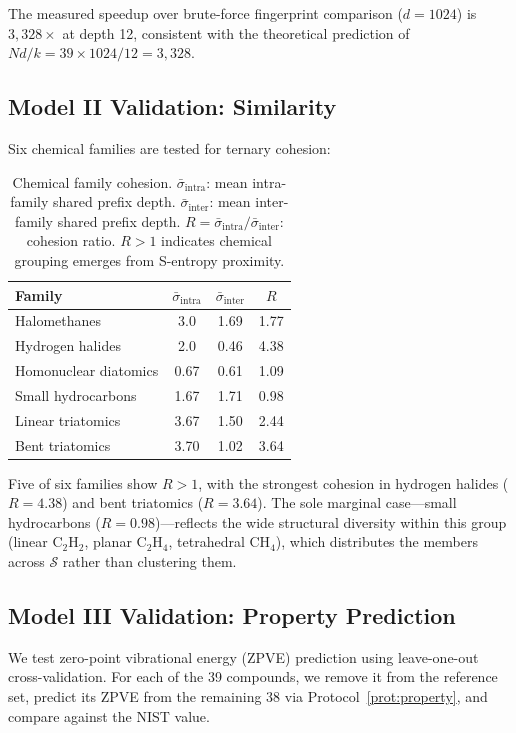 \documentclass[11pt,twocolumn,a4paper]{article}
\theoremstyle{definition}
\theoremstyle{remark}
\newcommand{\Sspace}{\mathcal{S}}
\begin{document}
The measured speedup over brute-force fingerprint comparison ($d = 1024$) is $3{,}328\times$ at depth 12, consistent with the theoretical prediction of $Nd/k = 39 \times 1024 / 12 = 3{,}328$.

\subsection{Model II Validation: Similarity}

Six chemical families are tested for ternary cohesion:

\begin{table}[h]
\centering
\small
\begin{tabular}{lccc}
\toprule
\textbf{Family} & $\bar{\sigma}_{\mathrm{intra}}$ & $\bar{\sigma}_{\mathrm{inter}}$ & $R$ \\
\midrule
Halomethanes & 3.0 & 1.69 & 1.77 \\
Hydrogen halides & 2.0 & 0.46 & 4.38 \\
Homonuclear diatomics & 0.67 & 0.61 & 1.09 \\
Small hydrocarbons & 1.67 & 1.71 & 0.98 \\
Linear triatomics & 3.67 & 1.50 & 2.44 \\
Bent triatomics & 3.70 & 1.02 & 3.64 \\
\bottomrule
\end{tabular}
\caption{Chemical family cohesion. $\bar{\sigma}_{\mathrm{intra}}$: mean intra-family shared prefix depth. $\bar{\sigma}_{\mathrm{inter}}$: mean inter-family shared prefix depth. $R = \bar{\sigma}_{\mathrm{intra}}/\bar{\sigma}_{\mathrm{inter}}$: cohesion ratio. $R > 1$ indicates chemical grouping emerges from S-entropy proximity.}
\label{tab:cohesion}
\end{table}

Five of six families show $R > 1$, with the strongest cohesion in hydrogen halides ($R = 4.38$) and bent triatomics ($R = 3.64$). The sole marginal case---small hydrocarbons ($R = 0.98$)---reflects the wide structural diversity within this group (linear C$_2$H$_2$, planar C$_2$H$_4$, tetrahedral CH$_4$), which distributes the members across $\Sspace$ rather than clustering them.

\subsection{Model III Validation: Property Prediction}

We test zero-point vibrational energy (ZPVE) prediction using leave-one-out cross-validation. For each of the 39 compounds, we remove it from the reference set, predict its ZPVE from the remaining 38 via Protocol~\ref{prot:property}, and compare against the NIST value.
\end{document}
